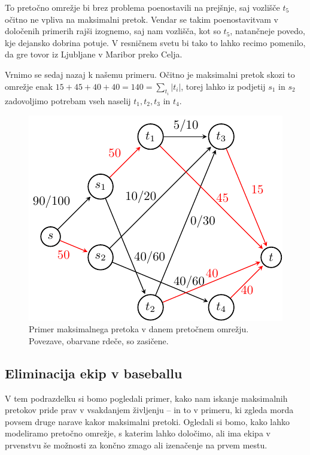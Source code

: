 \documentclass[mat1]{fmfdelo}
\begin{document}
To pretočno omrežje bi brez problema poenostavili na prejšnje, saj vozlišče $t_5$ očitno ne vpliva na maksimalni pretok. Vendar se takim poenostavitvam v določenih primerih
rajši izognemo, saj nam vozlišča, kot so $t_5$, natančneje povedo, kje dejansko dobrina potuje. V resničnem svetu bi tako to lahko recimo pomenilo, da gre tovor iz Ljubljane
v Maribor preko Celja.

Vrnimo se sedaj nazaj k našemu primeru. Očitno je maksimalni pretok skozi to omrežje enak $15 + 45 + 40 + 40 = 140 = \sum_{t_i} |t_i|$, torej lahko iz podjetij $s_1$ in $s_2$
zadovoljimo potrebam vseh naselij $t_1, t_2, t_3$ in $t_4$.

\begin{figure}[H]
  \centering
  \includegraphics{images/primer1-3.pdf}
  \caption{Primer maksimalnega pretoka v danem pretočnem omrežju. Povezave, obarvane rdeče, so zasičene.}
\end{figure}


\subsection{Eliminacija ekip v baseballu}

V tem podrazdelku si bomo pogledali primer, kako nam iskanje maksimalnih pretokov pride prav v vsakdanjem življenju -- in to v primeru, ki zgleda morda povsem druge narave kakor maksimalni pretoki. Ogledali si bomo, kako lahko modeliramo pretočno omrežje, s katerim lahko določimo, ali ima ekipa v prvenstvu še možnosti za končno zmago ali izenačenje na prvem mestu.\\
\end{document}
